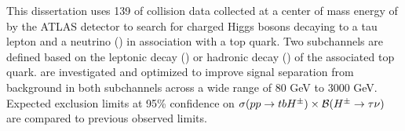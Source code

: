 

This dissertation uses 139 \ifb of \pp collision data collected at a center of mass energy of \sqs by the ATLAS detector to search for charged Higgs bosons decaying to a tau lepton and a neutrino (\HpmLong) in association with a top quark. Two subchannels are defined based on the leptonic decay (\taulep) or hadronic decay (\taujets) of the associated top quark.  are investigated and optimized to improve signal separation from background in both subchannels across a wide \mHpm range of 80 GeV to 3000 GeV. Expected exclusion limits at 95\% confidence on $\sigma(pp \to tbH^{\pm})\times \mathrm{\cal{B}}(H^{\pm} \to \tau \nu)$ are compared to previous observed limits.


